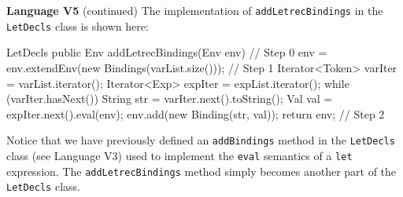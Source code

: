\begin{minipage}[t]{\sw}
\slidenumber
\LARGE
{\bf Language V5} (continued)\exx
The implementation of \verb'addLetrecBindings'
in the \verb'LetDecls' class is shown here:
{\Large
\begin{qv}
LetDecls
    public Env addLetrecBindings(Env env) {
        // Step 0
        env = env.extendEnv(new Bindings(varList.size()));
        // Step 1
        Iterator<Token> varIter = varList.iterator();
        Iterator<Exp> expIter = expList.iterator();
        while (varIter.hasNext()) {
            String str = varIter.next().toString();
            Val val = expIter.next().eval(env);
            env.add(new Binding(str, val));
        }
        return env; // Step 2
    }
\end{qv}
}
Notice that we have previously defined an \verb'addBindings' method
in the \verb'LetDecls' class (see Language V3)
used to implement the \verb'eval' semantics of a \verb'let' expression.
The \verb'addLetrecBindings' method simply becomes another part
of the \verb'LetDecls' class.
\end{minipage}
\clearpage
